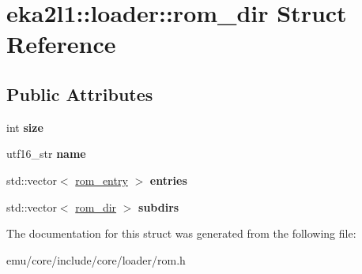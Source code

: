 \hypertarget{structeka2l1_1_1loader_1_1rom__dir}{}\section{eka2l1\+:\+:loader\+:\+:rom\+\_\+dir Struct Reference}
\label{structeka2l1_1_1loader_1_1rom__dir}
\subsection*{Public Attributes}
\begin{DoxyCompactItemize}
\item 
\mbox{\label{structeka2l1_1_1loader_1_1rom__dir_a1b9b6c0e95720f59ac7860256e278543}} 
int {\bfseries size}
\item 
\mbox{\label{structeka2l1_1_1loader_1_1rom__dir_abee202ac5008cb01139ede5f52bc2dc1}} 
utf16\+\_\+str {\bfseries name}
\item 
\mbox{\label{structeka2l1_1_1loader_1_1rom__dir_a929d0eff860bdd087611bd66e8c58a20}} 
std\+::vector$<$ \mbox{\hyperlink{structeka2l1_1_1loader_1_1rom__entry}{rom\+\_\+entry}} $>$ {\bfseries entries}
\item 
\mbox{\label{structeka2l1_1_1loader_1_1rom__dir_a6bf34a1e792026767fefa89425262a66}} 
std\+::vector$<$ \mbox{\hyperlink{structeka2l1_1_1loader_1_1rom__dir}{rom\+\_\+dir}} $>$ {\bfseries subdirs}
\end{DoxyCompactItemize}


The documentation for this struct was generated from the following file\+:\begin{DoxyCompactItemize}
\item 
emu/core/include/core/loader/rom.\+h\end{DoxyCompactItemize}
